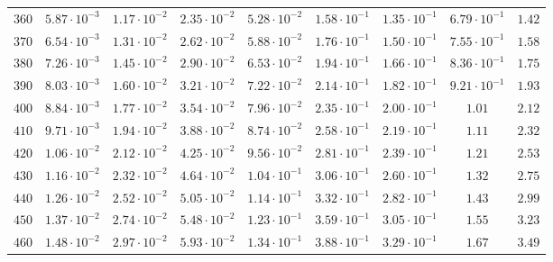 \begin{landscape}
\begin{table}
\begin{tabular}{lcccccccc}
$	360	$ & $	5.87 \cdot 10^{-3} 	$ & $	1.17 \cdot 10^{-2} 	$ & $	2.35 \cdot 10^{-2} 	$ & $	5.28 \cdot 10^{-2} 	$ & $	1.58 \cdot 10^{-1} 	$ & $	1.35 \cdot 10^{-1} 	$ & $	6.79 \cdot 10^{-1} 	$ & $	1.42 	 $ \\
$	370	$ & $	6.54 \cdot 10^{-3} 	$ & $	1.31 \cdot 10^{-2} 	$ & $	2.62 \cdot 10^{-2} 	$ & $	5.88 \cdot 10^{-2} 	$ & $	1.76 \cdot 10^{-1} 	$ & $	1.50 \cdot 10^{-1} 	$ & $	7.55 \cdot 10^{-1} 	$ & $	1.58 	 $ \\
$	380	$ & $	7.26 \cdot 10^{-3} 	$ & $	1.45 \cdot 10^{-2} 	$ & $	2.90 \cdot 10^{-2} 	$ & $	6.53 \cdot 10^{-2} 	$ & $	1.94 \cdot 10^{-1} 	$ & $	1.66 \cdot 10^{-1} 	$ & $	8.36 \cdot 10^{-1} 	$ & $	1.75 	 $ \\
$	390	$ & $	8.03 \cdot 10^{-3} 	$ & $	1.60 \cdot 10^{-2} 	$ & $	3.21 \cdot 10^{-2} 	$ & $	7.22 \cdot 10^{-2} 	$ & $	2.14 \cdot 10^{-1} 	$ & $	1.82 \cdot 10^{-1} 	$ & $	9.21 \cdot 10^{-1} 	$ & $	1.93 	 $ \\
$	400	$ & $	8.84 \cdot 10^{-3} 	$ & $	1.77 \cdot 10^{-2} 	$ & $	3.54 \cdot 10^{-2} 	$ & $	7.96 \cdot 10^{-2} 	$ & $	2.35 \cdot 10^{-1} 	$ & $	2.00 \cdot 10^{-1} 	$ & $	1.01 	$ & $	2.12 	 $ \\
$	410	$ & $	9.71 \cdot 10^{-3} 	$ & $	1.94 \cdot 10^{-2} 	$ & $	3.88 \cdot 10^{-2} 	$ & $	8.74 \cdot 10^{-2} 	$ & $	2.58 \cdot 10^{-1} 	$ & $	2.19 \cdot 10^{-1} 	$ & $	1.11 	$ & $	2.32 	 $ \\
$	420	$ & $	1.06 \cdot 10^{-2} 	$ & $	2.12 \cdot 10^{-2} 	$ & $	4.25 \cdot 10^{-2} 	$ & $	9.56 \cdot 10^{-2} 	$ & $	2.81 \cdot 10^{-1} 	$ & $	2.39 \cdot 10^{-1} 	$ & $	1.21 	$ & $	2.53 	 $ \\
$	430	$ & $	1.16 \cdot 10^{-2} 	$ & $	2.32 \cdot 10^{-2} 	$ & $	4.64 \cdot 10^{-2} 	$ & $	1.04 \cdot 10^{-1} 	$ & $	3.06 \cdot 10^{-1} 	$ & $	2.60 \cdot 10^{-1} 	$ & $	1.32 	$ & $	2.75 	 $ \\
$	440	$ & $	1.26 \cdot 10^{-2} 	$ & $	2.52 \cdot 10^{-2} 	$ & $	5.05 \cdot 10^{-2} 	$ & $	1.14 \cdot 10^{-1} 	$ & $	3.32 \cdot 10^{-1} 	$ & $	2.82 \cdot 10^{-1} 	$ & $	1.43 	$ & $	2.99 	 $ \\
$	450	$ & $	1.37 \cdot 10^{-2} 	$ & $	2.74 \cdot 10^{-2} 	$ & $	5.48 \cdot 10^{-2} 	$ & $	1.23 \cdot 10^{-1} 	$ & $	3.59 \cdot 10^{-1} 	$ & $	3.05 \cdot 10^{-1} 	$ & $	1.55 	$ & $	3.23 	 $ \\
$	460	$ & $	1.48 \cdot 10^{-2} 	$ & $	2.97 \cdot 10^{-2} 	$ & $	5.93 \cdot 10^{-2} 	$ & $	1.34 \cdot 10^{-1} 	$ & $	3.88 \cdot 10^{-1} 	$ & $	3.29 \cdot 10^{-1} 	$ & $	1.67 	$ & $	3.49 	 $ \\

\end{tabular}
\end{table}
\end{landscape}

